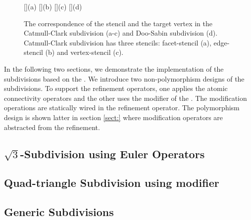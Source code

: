 \begin{figure}
  \centering
  []{(a)}
  []{(b)}
  []{(c)}
  []{(d)}
  \caption{The correspondence of the stencil and the 
           target vertex in the Catmull-Clark subdivision (a-c)
	   and Doo-Sabin subdivision (d). Catmull-Clark
	   subdivision has three stencils: facet-stencil (a), 
	   edge-stencil (b) and vertex-stencil (c).}
  \label{fig:RefMap}
\end{figure}

In the following two sections, we demonstrate the implementation of
the subdivisions based on the \cgalpoly.  We introduce two
non-polymorphism designs of the subdivisions.  To support the
refinement operators, one applies the atomic connectivity operators
and the other uses the modifier of the \cgalpoly.  The modification
operations are statically wired in the refinement operator. The
polymorphism design is shown latter in section \ref{sect:} where
modification operators are abstracted from the refinement.


\subsection{$\sqrt{3}$-Subdivision using Euler Operators}


\subsection{Quad-triangle Subdivision using modifier}


\subsection{Generic Subdivisions}
